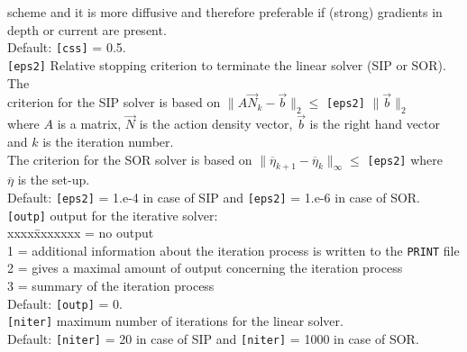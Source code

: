\documentclass[12pt]{book}
\begin{document}
\begin{tabbing}
                  scheme and it is more diffusive and therefore preferable if (strong) gradients in\\
                  depth or current are present.\\
                  Default: {\tt [css]} = 0.5.\-\\
{\tt [eps2]}   \> Relative stopping criterion to terminate the linear solver (SIP or SOR). The\+\\
                  criterion for the SIP solver is based on
                  $\| A {\vec{N}}_k - \vec{b} \|_2 \leq$ {\tt [eps2]} $\| \vec{b} \|_2 $\\
                  where $A$ is a matrix, $\vec{N}$ is the action density vector, $\vec{b}$ is the right hand vector\\
                  and $k$ is the iteration number.\\
                  The criterion for the SOR solver is based on $\| {\overline{\eta}}_{k+1} - {\overline{\eta}}_{k} \|_{\infty} \leq$ {\tt [eps2]} where\\
                  $\overline{\eta}$ is the set-up.\\
                  Default: {\tt [eps2]} = 1.e-4 in case of SIP and {\tt [eps2]} = 1.e-6 in case of SOR.\-\\
{\tt [outp]}   \> output for the iterative solver:\+\\
                  \pushtabs
                  xxxx\=xxxxxxx  \> = no output\\
                  1 \> = additional information about the iteration process is written to the {\tt PRINT} file\\
                  2 \> = gives a maximal amount of output concerning the iteration process\\
                  3 \> = summary of the iteration process\\
                  \poptabs
                  Default: {\tt [outp]} = 0.\-\\
{\tt [niter]}  \> maximum number of iterations for the linear solver.\+\\
                  Default: {\tt [niter]} = 20 in case of SIP and {\tt [niter]} = 1000 in case of SOR.\-\\
\end{tabbing}
\end{document}
